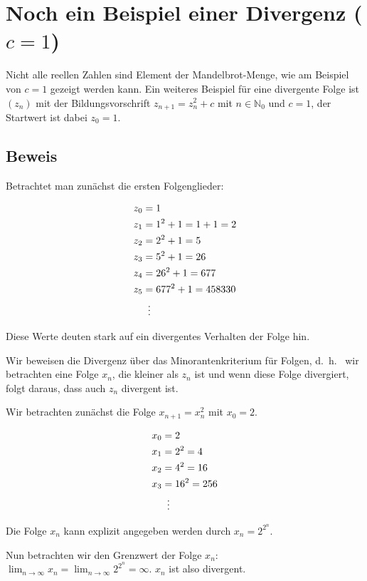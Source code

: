 \documentclass[a4paper, 12pt]{book}
\begin{document}
\hfill\blacksquare

\section{Noch ein Beispiel einer Divergenz ($c=1$)}

Nicht alle reellen Zahlen sind Element der Mandelbrot-Menge, wie am
Beispiel von \(c = 1\) gezeigt werden kann. Ein weiteres Beispiel
für eine divergente Folge ist \(\left( z_{n} \right)\) mit der
Bildungsvorschrift \(z_{n + 1} = z_{n}^{2} + c\) mit
\(n \in \mathbb{N}_{0}\) und \(c = 1\), der Startwert ist dabei
\(z_{0} = 1\).

\subsection*{Beweis}

Betrachtet man zunächst die ersten Folgenglieder:

\begin{align*}
z_{0} &= 1\\
z_{1} &= 1^{2} + 1 = 1 + 1 = 2\\
z_{2} &= 2^{2} + 1 = 5\\
z_{3} &= 5^{2} + 1 = 26\\
z_{4} &= 26^{2} + 1 = 677\\
z_{5} &= 677^{2} + 1 = 458330\\
&\vdotswithin{=}
\end{align*}

Diese Werte deuten stark auf ein divergentes Verhalten der Folge hin.

Wir beweisen die Divergenz über das Minorantenkriterium für Folgen, d.~h.~%
wir betrachten eine Folge \(x_{n}\), die kleiner als \(z_{n}\) ist und
wenn diese Folge divergiert, folgt daraus, dass auch \(z_{n}\) divergent
ist.

Wir betrachten zunächst die Folge \(x_{n + 1} = x_{n}^{2}\) mit
\(x_{0} = 2\).

\begin{align*}
x_{0} &= 2\\
x_{1} &= 2^{2} = 4\\
x_{2} &= 4^{2} = 16\\
x_{3} &= 16^{2} = 256\\
&\vdotswithin{=}
\end{align*}

Die Folge \(x_{n}\) kann explizit angegeben werden durch
\(x_{n} = 2^{2^{n}}\).

Nun betrachten wir den Grenzwert der Folge \(x_{n}\):
\(\lim_{n \rightarrow \infty}x_{n} = \lim_{n \rightarrow \infty}2^{2^{n}} = \infty\).
\(x_{n}\) ist also divergent.
\end{document}
